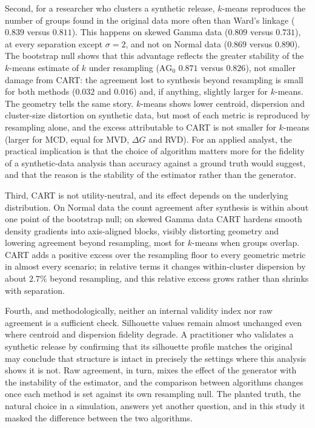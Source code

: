 \documentclass[pdflatex,referee]{sn-jnl}
\begin{document}
Second, for a researcher who clusters a synthetic release, $k$-means
reproduces the number of groups found in the original data more often than
Ward's linkage ($0.839$ versus $0.811$). This happens on skewed Gamma data
($0.809$ versus $0.731$), at every separation except $\sigma = 2$, and not on
Normal data ($0.869$ versus $0.890$). The bootstrap null shows that this
advantage reflects the greater stability of the $k$-means estimate of $k$
under resampling ($\mathrm{AG}_0$ $0.871$ versus $0.826$), not smaller damage
from CART: the agreement lost to synthesis beyond resampling is small for
both methods ($0.032$ and $0.016$) and, if anything, slightly larger for
$k$-means. The geometry tells the same story. $k$-means shows lower centroid,
dispersion and cluster-size distortion on synthetic data, but most of each
metric is reproduced by resampling alone, and the excess attributable to CART
is not smaller for $k$-means (larger for MCD, equal for MVD, $\Delta G$ and
RVD). For an applied analyst, the practical implication is that the choice of
algorithm matters more for the fidelity of a synthetic-data analysis than
accuracy against a ground truth would suggest, and that the reason is the
stability of the estimator rather than the generator.

Third, CART is not utility-neutral, and its effect depends on the underlying
distribution. On Normal data the count agreement after synthesis is within
about one point of the bootstrap null; on skewed Gamma data CART hardens smooth
density gradients into axis-aligned blocks, visibly distorting geometry and
lowering agreement beyond resampling, most for $k$-means when groups overlap.
CART adds a positive excess over the resampling floor to every geometric
metric in almost every scenario; in relative terms it changes within-cluster
dispersion by about $2.7\%$ beyond resampling, and this relative excess grows
rather than shrinks with separation.

Fourth, and methodologically, neither an internal validity index nor raw
agreement is a sufficient check. Silhouette values remain almost unchanged
even where centroid and dispersion fidelity degrade. A practitioner who
validates a synthetic release by confirming that its silhouette profile
matches the original may conclude that structure is intact in precisely the
settings where this analysis shows it is not. Raw agreement, in turn, mixes
the effect of the generator with the instability of the estimator, and the
comparison between algorithms changes once each method is set against its own
resampling null. The planted truth, the natural choice in a simulation,
answers yet another question, and in this study it masked the difference
between the two algorithms.
\end{document}
